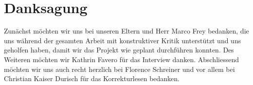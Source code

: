 
\chapter*{Danksagung}
Zunächst möchten wir uns bei unseren Eltern und Herr Marco Frey bedanken, die uns während der gesamten Arbeit mit konstruktiver Kritik unterstützt und uns geholfen haben, damit wir das Projekt wie geplant durchführen konnten. Des Weiteren möchten wir Kathrin Favero für das Interview danken.
\newline
Abschliessend möchten wir uns auch recht herzlich bei Florence Schreiner und vor allem bei Christian Kaiser Durisch für das Korrekturlesen bedanken.
\pagebreak